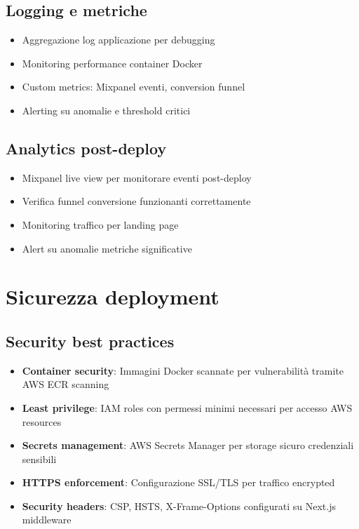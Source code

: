 \subsection{Logging e metriche}
\begin{itemize}
  \item Aggregazione log applicazione per debugging
  \item Monitoring performance container Docker
  \item Custom metrics: Mixpanel eventi, conversion funnel
  \item Alerting su anomalie e threshold critici
\end{itemize}

\subsection{Analytics post-deploy}
\begin{itemize}
  \item Mixpanel live view per monitorare eventi post-deploy
  \item Verifica funnel conversione funzionanti correttamente
  \item Monitoring traffico per landing page
  \item Alert su anomalie metriche significative
\end{itemize}

\section{Sicurezza deployment}

\subsection{Security best practices}
\begin{itemize}
  \item \textbf{Container security}: Immagini Docker scannate per vulnerabilità tramite AWS ECR scanning
  \item \textbf{Least privilege}: IAM roles con permessi minimi necessari per accesso AWS resources
  \item \textbf{Secrets management}: AWS Secrets Manager per storage sicuro credenziali sensibili
  \item \textbf{HTTPS enforcement}: Configurazione SSL/TLS per traffico encrypted
  \item \textbf{Security headers}: CSP, HSTS, X-Frame-Options configurati su Next.js middleware
\end{itemize}

